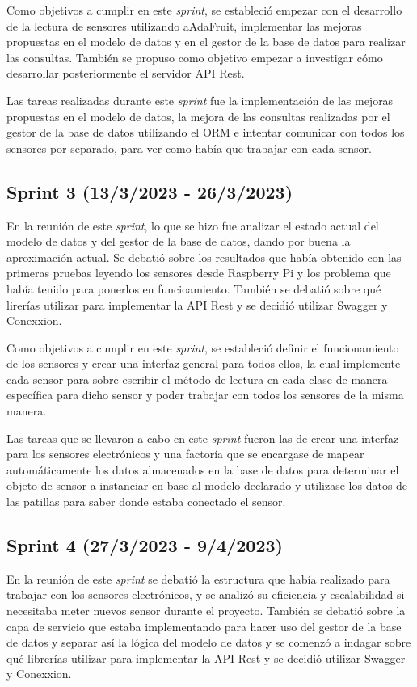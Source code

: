 Como objetivos a cumplir en este \textit{sprint}, se estableció empezar con el desarrollo de la lectura de sensores utilizando aAdaFruit, implementar las mejoras propuestas en el modelo de datos y en el gestor de la base de datos para realizar las consultas. También se propuso como objetivo empezar a investigar cómo desarrollar posteriormente el servidor API Rest.

Las tareas realizadas durante este \textit{sprint} fue la implementación de las mejoras propuestas en el modelo de datos, la mejora de las consultas realizadas por el gestor de la base de datos utilizando el ORM e intentar comunicar con todos los sensores por separado, para ver como había que trabajar con cada sensor.

\subsection{Sprint 3 (13/3/2023 - 26/3/2023)}
En la reunión de este \textit{sprint}, lo que se hizo fue analizar el estado actual del modelo de datos y del gestor de la base de datos, dando por buena la aproximación actual. Se debatió sobre los resultados que había obtenido con las primeras pruebas leyendo los sensores desde Raspberry Pi y los problema que había tenido para ponerlos en funcioamiento. También se debatió sobre qué lirerías utilizar para implementar la API Rest y se decidió utilizar Swagger y Conexxion.

Como objetivos a cumplir en este \textit{sprint}, se estableció definir el funcionamiento de los sensores y crear una interfaz general para todos ellos, la cual implemente cada sensor para sobre escribir el método de lectura en cada clase de manera específica para dicho sensor y poder trabajar con todos los sensores de la misma manera.

Las tareas que se llevaron a cabo en este \textit{sprint} fueron las de crear una interfaz para los sensores electrónicos y una factoría que se encargase de mapear automáticamente los datos almacenados en la base de datos para determinar el objeto de sensor a instanciar en base al modelo declarado y utilizase los datos de las patillas para saber donde estaba conectado el sensor.


\subsection{Sprint 4 (27/3/2023 - 9/4/2023)}
En la reunión de este \textit{sprint} se debatió la estructura que había realizado para trabajar con los sensores electrónicos, y se analizó su eficiencia y escalabilidad si necesitaba meter nuevos sensor durante el proyecto. También se debatió sobre la capa de servicio que estaba implementando para hacer uso del gestor de la base de datos y separar así la lógica del modelo de datos y se comenzó a indagar sobre qué librerías utilizar para implementar la API Rest y se decidió utilizar Swagger y Conexxion.

